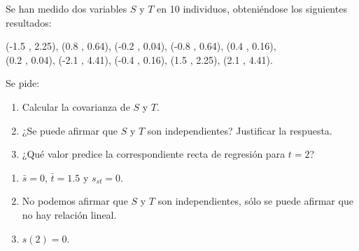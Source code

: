 {Se han medido dos variables $S$ y $T$ en 10 individuos, obteniéndose los siguientes resultados:
\begin{center}
(-1.5 , 2.25), (0.8 , 0.64), (-0.2 , 0.04), (-0.8 , 0.64), (0.4 , 0.16),\\
(0.2 , 0.04), (-2.1 , 4.41), (-0.4 , 0.16), (1.5 , 2.25), (2.1 ,
4.41).
\end{center}
Se pide:
\begin{enumerate}
\item Calcular la covarianza de $S$ y $T$.
\item ¿Se puede afirmar que $S$ y $T$ son independientes?
Justificar la respuesta.
\item ¿Qué valor predice la correspondiente recta de regresión para $t=2$?
\end{enumerate}
}
{
\begin{enumerate}
\item $\bar s=0$, $\bar t=1.5$ y $s_{st}=0$.
\item No podemos afirmar que $S$ y $T$ son independientes, sólo se puede afirmar que no hay relación lineal.
\item $s(2)=0$.
\end{enumerate}
}
{}


